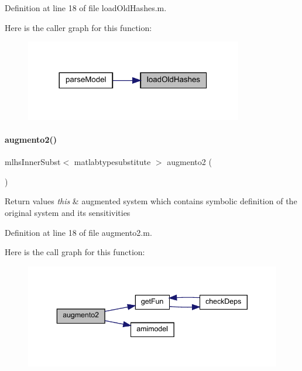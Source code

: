 Definition at line 18 of file load\+Old\+Hashes.\+m.

Here is the caller graph for this function\+:
\nopagebreak
\begin{figure}[H]
\begin{center}
\leavevmode
\includegraphics[width=269pt]{classamimodel_a93346c96338624e417ee9732ffd96b28_icgraph}
\end{center}
\end{figure}
\mbox{\label{classamimodel_abddb278082c1ff018f3b0ef121bba51a}} 
\paragraph{\texorpdfstring{augmento2()}{augmento2()}}
{\footnotesize\ttfamily mlhs\+Inner\+Subst$<$ matlabtypesubstitute $>$ augmento2 (\begin{DoxyParamCaption}{ }\end{DoxyParamCaption})}


\begin{DoxyRetVals}{Return values}
{\em this} & augmented system which contains symbolic definition of the original system and its sensitivities \\
\hline
\end{DoxyRetVals}


Definition at line 18 of file augmento2.\+m.

Here is the call graph for this function\+:
\nopagebreak
\begin{figure}[H]
\begin{center}
\leavevmode
\includegraphics[width=343pt]{classamimodel_abddb278082c1ff018f3b0ef121bba51a_cgraph}
\end{center}
\end{figure}
\mbox{\label{classamimodel_ab8fea0d36484809cb38e0035a564e919}} 
